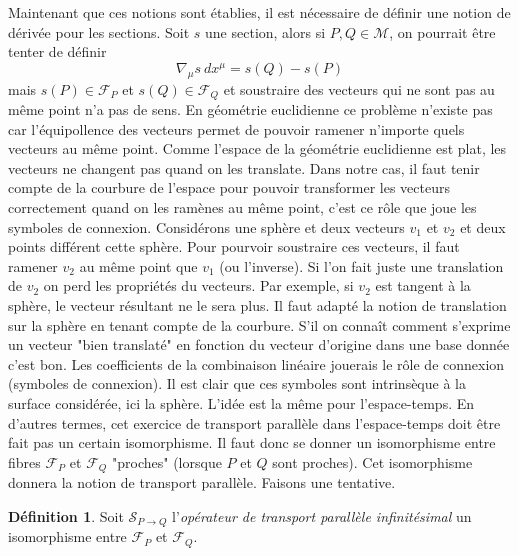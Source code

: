 \documentclass[a4paper,11pt]{report}
\theoremstyle{definition}
\theoremstyle{plain}
\theoremstyle{definition}
\newtheorem{defn}{Définition}[chapter]
\theoremstyle{remark}
\newcommand{\M}{\mathscr{M}}
\newcommand{\F}{\mathcal{F}}
\renewcommand{\S}{\mathscr{S}}
\begin{document}
                Maintenant que ces notions sont établies, il est nécessaire de définir une notion de dérivée pour les sections. Soit $s$ une section, alors si $P,Q\in\M$, on pourrait être tenter de définir
                \begin{equation}
                    \nabla_\mu s~ dx^\mu = s(Q)-s(P)
                \end{equation}
                 mais $s(P)\in\F_P$ et $s(Q)\in\F_Q$ et soustraire des vecteurs qui ne sont pas au même point n'a pas de sens. En géométrie euclidienne ce problème n'existe pas car l'équipollence des vecteurs permet de pouvoir ramener n'importe quels vecteurs au même point. Comme l'espace de la géométrie euclidienne est plat, les vecteurs ne changent pas quand on les translate. Dans notre cas, il faut tenir compte de la courbure de l'espace pour pouvoir transformer les vecteurs correctement quand on les ramènes au même point, c'est ce rôle que joue les symboles de connexion. Considérons une sphère et deux vecteurs $v_1$ et $v_2$ et deux points différent cette sphère. Pour pourvoir soustraire ces vecteurs, il faut ramener $v_2$ au même point que $v_1$ (ou l'inverse). Si l'on fait juste une translation de $v_2$ on perd les propriétés du vecteurs. Par exemple, si $v_2$ est tangent à la sphère, le vecteur résultant ne le sera plus. Il faut adapté la notion de translation sur la sphère en tenant compte de la courbure. S'il on connaît comment s'exprime un vecteur "bien translaté" en fonction du vecteur d'origine dans une base donnée c'est bon. Les coefficients de la combinaison linéaire jouerais le rôle de connexion (symboles de connexion). Il est clair que ces symboles sont intrinsèque à la surface considérée, ici la sphère. L'idée est la même pour l'espace-temps. En d'autres termes, cet exercice de transport parallèle dans l'espace-temps doit être fait pas un certain isomorphisme. Il faut donc se donner un isomorphisme entre fibres $\F_P$ et $\F_Q$ "proches" (lorsque $P$ et $Q$ sont proches). Cet isomorphisme donnera la notion de transport parallèle. Faisons une tentative.
                 
                 \begin{defn}
                    Soit $\S_{P\to Q}$ l'\textit{opérateur de transport parallèle infinitésimal} un isomorphisme entre $\F_P$ et $\F_Q$.
                 \end{defn}
                 
\end{document}
